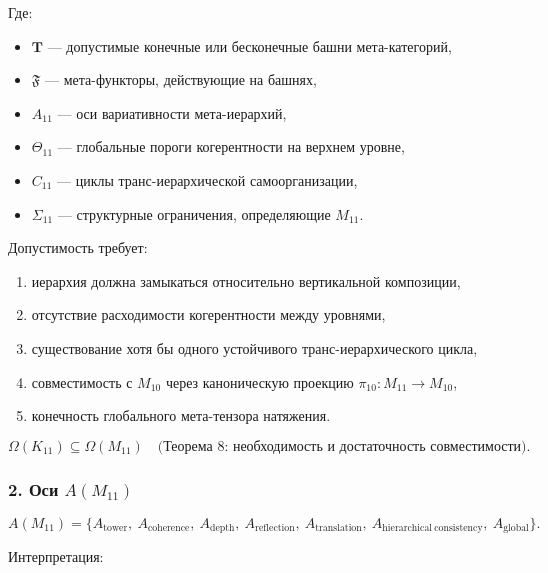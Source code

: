 Где:

\begin{itemize}
    \item $\mathbf{T}$ — допустимые конечные или бесконечные башни мета-категорий,
    \item $\mathfrak{F}$ — мета-функторы, действующие на башнях,
    \item $A_{11}$ — оси вариативности мета-иерархий,
    \item $\Theta_{11}$ — глобальные пороги когерентности на верхнем уровне,
    \item $C_{11}$ — циклы транс-иерархической самоорганизации,
    \item $\Sigma_{11}$ — структурные ограничения, определяющие $M_{11}$.
\end{itemize}

Допустимость требует:

\begin{enumerate}
    \item иерархия должна замыкаться относительно вертикальной композиции,
    \item отсутствие расходимости когерентности между уровнями,
    \item существование хотя бы одного устойчивого транс-иерархического цикла,
    \item совместимость с $M_{10}$ через каноническую проекцию
          $\pi_{10}:M_{11}\to M_{10}$,
    \item конечность глобального мета-тензора натяжения.
\end{enumerate}

\[
\Omega(K_{11}) \subseteq \Omega(M_{11})
\quad\text{(Теорема 8: необходимость и достаточность совместимости)}.
\]

\subsubsection*{2. Оси $A(M_{11})$}

\[
A(M_{11}) =
\{
A_{\mathrm{tower}},\
A_{\mathrm{coherence}},\
A_{\mathrm{depth}},\
A_{\mathrm{reflection}},\
A_{\mathrm{translation}},\
A_{\mathrm{hierarchical\ consistency}},\
A_{\mathrm{global}}
\}.
\]

Интерпретация:

